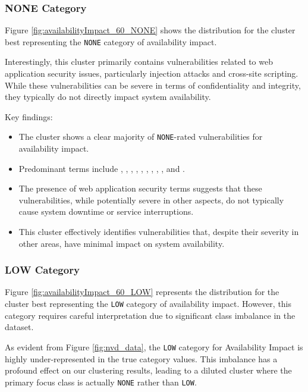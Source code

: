 \documentclass[12pt]{article}
\begin{document}
\subsubsection*{NONE Category}

Figure \ref{fig:availabilityImpact_60_NONE} shows the distribution for the cluster best representing
the \texttt{NONE} category of availability impact.

Interestingly, this cluster primarily contains vulnerabilities related to web application security
issues, particularly injection attacks and cross-site scripting. While these vulnerabilities can be
severe in terms of confidentiality and integrity, they typically do not directly impact system
availability.

Key findings:

\begin{itemize}

	\item The cluster shows a clear majority of \texttt{NONE}-rated vulnerabilities for availability
	      impact.

	\item Predominant terms include , , , , , ,
	      , , , and .

	\item The presence of web application security terms suggests that these vulnerabilities, while
	      potentially severe in other aspects, do not typically cause system downtime or service
	      interruptions.

	\item This cluster effectively identifies vulnerabilities that, despite their severity in other
	      areas, have minimal impact on system availability.

\end{itemize}

\subsubsection*{LOW Category}

Figure \ref{fig:availabilityImpact_60_LOW} represents the distribution for the cluster best
representing the \texttt{LOW} category of availability impact. However, this category requires
careful interpretation due to significant class imbalance in the dataset.

As evident from Figure \ref{fig:nvd_data}, the \texttt{LOW} category for Availability Impact is
highly under-represented in the true category values. This imbalance has a profound effect on our
clustering results, leading to a diluted cluster where the primary focus class is actually
\texttt{NONE} rather than \texttt{LOW}.
\end{document}
